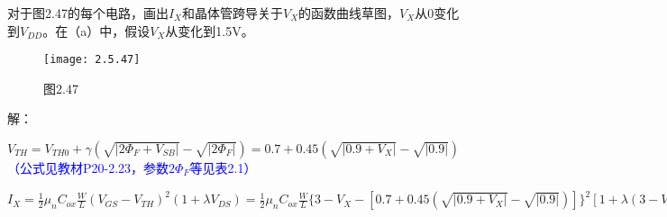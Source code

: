 




对于图2.47的每个电路，画出$I_X$和晶体管跨导关于$V_X$的函数曲线草图，$V_X$从0变化到$V_{DD}$。在（a）中，假设$V_X$从变化到1.5V。

		\begin{figure}[H] %
	\begin{minipage}{\linewidth}
		\texttt{[image: 2.5.47]}
	\end{minipage}
	\caption*{图2.47} %
\end{figure}

解：

\scalebox{3}{（a）}

$V_{TH}=V_{TH0}+\gamma(\sqrt{|2\Phi_F+V_{SB}|}-\sqrt{|2\Phi_F|})=0.7+0.45(\sqrt{|0.9+V_{X}|}-\sqrt{|0.9|})$\textcolor{blue}{（公式见教材P20-2.23，参数$2\Phi_F$等见表2.1）}

$I_X=\frac{1}{2}\mu_nC_{ox}\frac{W}{L}(V_{GS}-V_{TH})^2(1+\lambda V_{DS})=\frac{1}{2}\mu_nC_{ox}\frac{W}{L}\{3-V_{X}-[0.7+0.45(\sqrt{|0.9+V_{X}|}-\sqrt{|0.9|})]\}^2[1+\lambda (3-V_{X})]=\frac{1}{2}\mu_nC_{ox}\frac{W}{L}(2.727-V_{X}-0.45\sqrt{0.9+V_{X}})^2[1.3-0.1V_X]$






